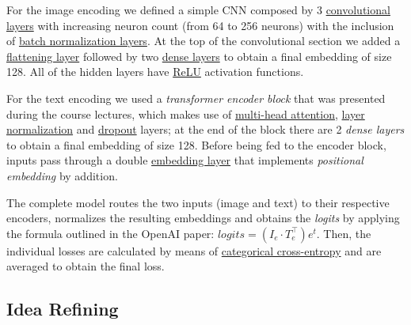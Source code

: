 \documentclass[10pt,twocolumn,letterpaper]{article}
\begin{document}
For the image encoding we defined a simple CNN composed by 3 \href{https://www.tensorflow.org/api_docs/python/tf/keras/layers/Conv2D}{convolutional layers} with increasing neuron count (from 64 to 256 neurons) with the inclusion of \href{https://www.tensorflow.org/api_docs/python/tf/keras/layers/BatchNormalization}{batch normalization layers}.
At the top of the convolutional section we added a \href{https://www.tensorflow.org/api_docs/python/tf/keras/layers/Flatten}{flattening layer} followed by two \href{https://www.tensorflow.org/api_docs/python/tf/keras/layers/Dense}{dense layers} to obtain a final embedding of size 128.
All of the hidden layers have \href{https://www.tensorflow.org/api_docs/python/tf/keras/layers/ReLU}{ReLU} activation functions.

For the text encoding we used a \textit{transformer encoder block} that was presented during the course lectures, which makes use of \href{https://www.tensorflow.org/api_docs/python/tf/keras/layers/MultiHeadAttention}{multi-head attention}, \href{https://www.tensorflow.org/api_docs/python/tf/keras/layers/LayerNormalization}{layer normalization} and \href{https://www.tensorflow.org/api_docs/python/tf/keras/layers/Dropout}{dropout} layers; at the end of the block there are 2 \textit{dense layers} to obtain a final embedding of size 128.
Before being fed to the encoder block, inputs pass through a double \href{https://www.tensorflow.org/api_docs/python/tf/keras/layers/Embedding}{embedding layer} that implements \textit{positional embedding} by addition.

The complete model routes the two inputs (image and text) to their respective encoders, normalizes the resulting embeddings and obtains the \textit{logits} by applying the formula outlined in the OpenAI paper: $logits = (I_e \cdot T_e^{\top})e^t$.
Then, the individual losses are calculated by means of \href{https://www.tensorflow.org/api_docs/python/tf/keras/losses/CategoricalCrossentropy}{categorical cross-entropy} and are averaged to obtain the final loss.

\subsection{Idea Refining}
\end{document}
